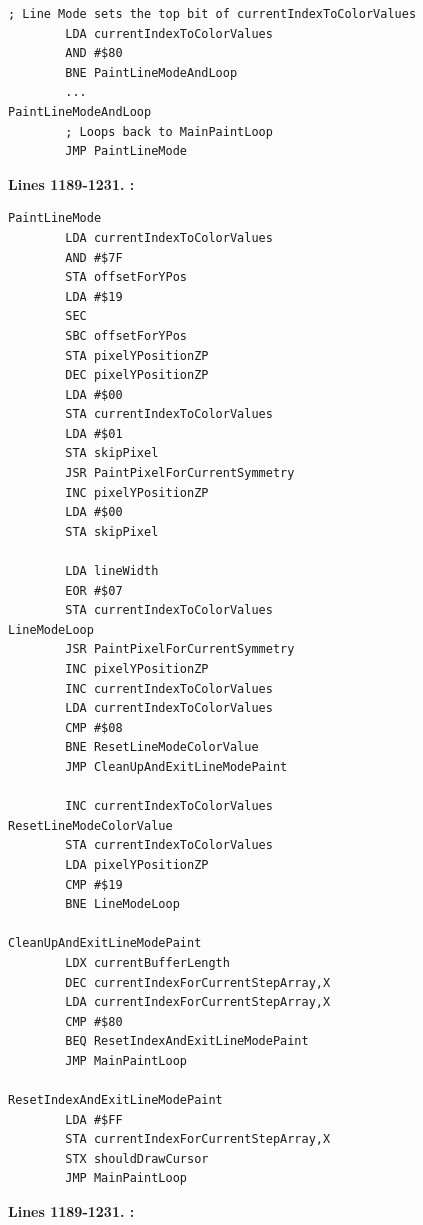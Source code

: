 \begin{lstlisting}[caption=From \icode{MainPaintLoop}.]
        ; Line Mode sets the top bit of currentIndexToColorValues
        LDA currentIndexToColorValues
        AND #$80
        BNE PaintLineModeAndLoop
        ...
PaintLineModeAndLoop
        ; Loops back to MainPaintLoop
        JMP PaintLineMode
\end{lstlisting}

\clearpage

\textbf{Lines 1189-1231. :} 
\clearpage

\clearpage
\begin{lstlisting}[caption=From \icode{PaintLineMode}.]
PaintLineMode 
        LDA currentIndexToColorValues
        AND #$7F
        STA offsetForYPos
        LDA #$19
        SEC 
        SBC offsetForYPos
        STA pixelYPositionZP
        DEC pixelYPositionZP
        LDA #$00
        STA currentIndexToColorValues
        LDA #$01
        STA skipPixel
        JSR PaintPixelForCurrentSymmetry
        INC pixelYPositionZP
        LDA #$00
        STA skipPixel

        LDA lineWidth
        EOR #$07
        STA currentIndexToColorValues
LineModeLoop   
        JSR PaintPixelForCurrentSymmetry
        INC pixelYPositionZP
        INC currentIndexToColorValues
        LDA currentIndexToColorValues
        CMP #$08
        BNE ResetLineModeColorValue
        JMP CleanUpAndExitLineModePaint

        INC currentIndexToColorValues
ResetLineModeColorValue   
        STA currentIndexToColorValues
        LDA pixelYPositionZP
        CMP #$19
        BNE LineModeLoop

CleanUpAndExitLineModePaint    
        LDX currentBufferLength
        DEC currentIndexForCurrentStepArray,X
        LDA currentIndexForCurrentStepArray,X
        CMP #$80
        BEQ ResetIndexAndExitLineModePaint
        JMP MainPaintLoop

ResetIndexAndExitLineModePaint   
        LDA #$FF
        STA currentIndexForCurrentStepArray,X
        STX shouldDrawCursor
        JMP MainPaintLoop
\end{lstlisting}
\clearpage

\textbf{Lines 1189-1231. :} 
\clearpage
